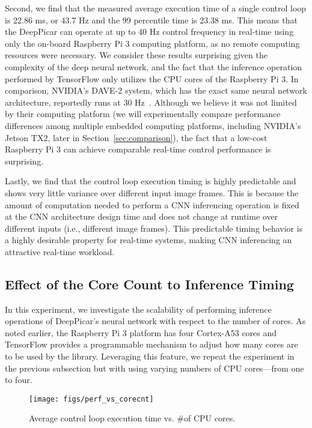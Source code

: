 Second, we find that the measured average
execution time of a single control loop is 22.86 ms, or 43.7 Hz and
the 99 percentile time is 23.38 ms.
This means that the DeepPicar can operate
at up to 40 Hz control frequency in real-time using only the on-board
Raspberry Pi 3 computing platform, as no remote computing resources 
were necessary. We consider these results surprising given the complexity
of the deep neural network, and the fact that the inference operation
performed by TensorFlow only utilizes the CPU cores of the Raspberry Pi 3.
In comparison, NVIDIA's DAVE-2 system, which has the exact same neural
network architecture, reportedly runs at 30 Hz~\cite{Bojarski2016}. 
Although we believe it was not
limited by their computing platform (we will experimentally compare
performance differences among multiple embedded computing platforms,
including NVIDIA's Jetson TX2, later in
Section~\ref{sec:comparison}), the fact that a low-cost
Raspberry Pi 3 can achieve comparable real-time control performance is
surprising.

Lastly, we find that the control loop execution timing is highly
predictable and shows very little variance over different input image
frames. This is because the amount of computation needed to perform
a CNN inferencing operation is fixed at the CNN architecture design
time and does not change at runtime over different inputs (i.e.,
different image frames). This predictable timing behavior is a highly
desirable property for real-time systems, making CNN inferencing an
attractive real-time workload.

\subsection{Effect of the Core Count to Inference Timing}

In this experiment, we investigate the scalability of performing
inference operations of DeepPicar's neural network with respect to the
number of cores. As noted earlier, the Raspberry Pi 3 platform has
four Cortex-A53 cores and TensorFlow 
provides a programmable mechanism to adjust how many cores are to be
used by the library. Leveraging this feature, we repeat the
experiment in the previous subsection but with using varying
numbers of CPU cores---from one to four.

\begin{figure}[h]
  \centering
  \texttt{[image: figs/perf\_vs\_corecnt]}
  \caption{Average control loop execution time vs. \#of CPU
    cores.}
  \label{fig:perf-vs-corecnt}
\end{figure}

